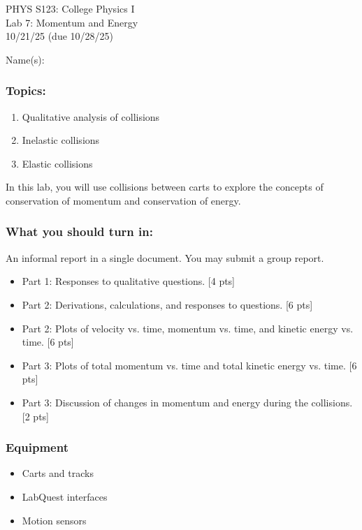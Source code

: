 \documentclass[11pt,letterpaper]{article}
\newcounter{question}[section]
\begin{document}
\setlength{\parindent}{0in}


\begin{flushright}
PHYS S123: College Physics I\\
Lab 7: Momentum and Energy\\
10/21/25 (due 10/28/25)
\end{flushright}

Name(s):\\


\subsubsection*{Topics:}
\begin{enumerate}
\setlength{\parskip}{3pt}
\item Qualitative analysis of collisions
\item Inelastic collisions
\item Elastic collisions
\end{enumerate}

In this lab, you will use collisions between carts to explore the concepts of conservation of momentum and conservation of energy.

\subsubsection*{What you should turn in:} 
An informal report in a single document. You may submit a group report.
\begin{itemize}
\setlength{\parskip}{3pt}
\item Part 1: Responses to qualitative questions. [4 pts]
\item Part 2: Derivations, calculations, and responses to questions. [6 pts]
\item Part 2: Plots of velocity vs. time, momentum vs. time, and kinetic energy vs. time. [6 pts]
\item Part 3: Plots of total momentum vs. time and total kinetic energy vs. time. [6 pts]
\item Part 3: Discussion of changes in momentum and energy during the collisions. [2 pts]
\end{itemize}

\subsubsection*{Equipment}
\begin{itemize}
\setlength{\parskip}{3pt}
\item Carts and tracks
\item LabQuest interfaces
\item Motion sensors
\end{itemize}
\end{document}
